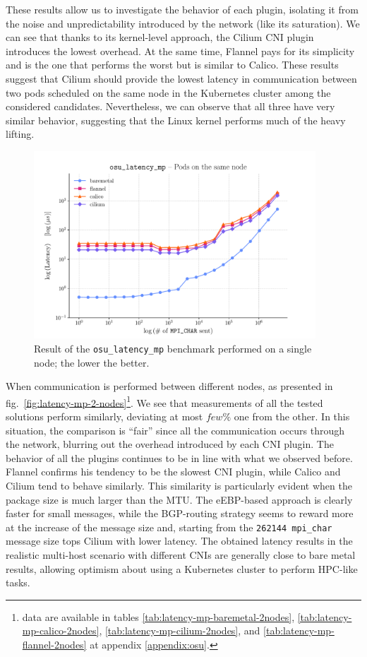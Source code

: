 These results allow us to investigate the behavior of each plugin, isolating it
from the noise and unpredictability introduced by the network (like its
saturation).
We can see that thanks to its kernel-level approach, the Cilium CNI plugin
introduces the lowest overhead.
At the same time, Flannel pays for its simplicity and is the one that performs
the worst but is similar to Calico.
These results suggest that Cilium should provide the lowest latency in
communication between two pods scheduled on the same node in the Kubernetes
cluster among the considered candidates.
Nevertheless, we can observe that all three have very similar behavior,
suggesting that the Linux kernel performs much of the heavy lifting.


\begin{figure}
  \centering
  \includegraphics[width=0.94\textwidth]{img/chpt3/latency_mp-1-node}
  \caption{Result of the \texttt{osu\_latency\_mp} benchmark performed on a single
    node; the lower the better.}
  \label{fig:latency-mp-1-node}
\end{figure}

When communication is performed between different nodes, as presented in
fig.~\ref{fig:latency-mp-2-nodes}\footnote{
  data are available in tables \ref{tab:latency-mp-baremetal-2nodes},
  \ref{tab:latency-mp-calico-2nodes}, \ref{tab:latency-mp-cilium-2nodes}, and
  \ref{tab:latency-mp-flannel-2nodes} at appendix \ref{appendix:osu}.
}.
We see that measurements of all the tested solutions perform similarly,
deviating at most $few\%$ one from the other.
In this situation, the comparison is ``fair'' since all the communication occurs
through the network, blurring out the overhead introduced by each CNI plugin.
The behavior of all the plugins continues to be in line with what we observed
before.
Flannel confirms his tendency to be the slowest CNI plugin, while Calico and
Cilium tend to behave similarly.
This similarity is particularly evident when the package size is much larger
than the MTU.
The eEBP-based approach is clearly faster for small messages, while the
BGP-routing strategy seems to reward more at the increase of the message size
and, starting from the \texttt{262144 mpi\_char} message size tops Cilium with
lower latency.
The obtained latency results in the realistic multi-host scenario with different
CNIs are generally close to bare metal results, allowing optimism about using a
Kubernetes cluster to perform HPC-like tasks.


